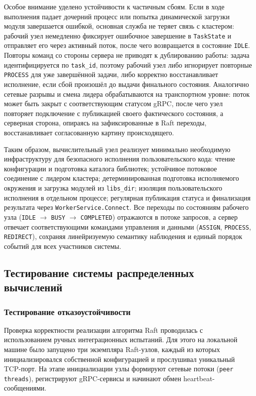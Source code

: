 Особое внимание уделено устойчивости к частичным сбоям. Если в ходе выполнения
падает дочерний процесс или попытка динамической загрузки модуля завершается
ошибкой, основная служба не теряет связь с кластером: рабочий узел немедленно
фиксирует ошибочное завершение в \texttt{TaskState} и отправляет его через
активный поток, после чего возвращается в состояние \texttt{IDLE}. Повторы
команд со стороны сервера не приводят к дублированию работы: задача
идентифицируется по \texttt{task\_id}, поэтому рабочий узел либо игнорирует повторные
\texttt{PROCESS} для уже завершённой задачи, либо корректно восстанавливает
исполнение, если сбой произошёл до выдачи финального состояния. Аналогично
сетевые разрывы и смена лидера обрабатываются на транспортном уровне: поток
может быть закрыт с соответствующим статусом gRPC, после чего узел повторяет
подключение с публикацией своего фактического состояния, а серверная сторона,
опираясь на зафиксированные в Raft переходы, восстанавливает согласованную
картину происходящего.

Таким образом, вычислительный узел реализует минимально необходимую
инфраструктуру для безопасного исполнения пользовательского кода: чтение
конфигурации и подготовка каталога библиотек; устойчивое потоковое соединение с
лидером кластера; детерминированная подготовка исполняемого окружения и
загрузка модулей из \texttt{libs\_dir}; изоляция пользовательского исполнения в
отдельном процессе; регулярная публикация статуса и финализация результата
через \texttt{WorkerService.Connect}. Все переходы по состояниям рабочего узла
(\texttt{IDLE} $\rightarrow$ \texttt{BUSY} $\rightarrow$ \texttt{COMPLETED})
отражаются в потоке запросов, а сервер отвечает соответствующими командами
управления и данными (\texttt{ASSIGN}, \texttt{PROCESS}, \texttt{REDIRECT}),
сохраняя линейризуемую семантику наблюдения и единый порядок событий для всех
участников системы.

\subsection{Тестирование системы распределенных вычислений}

\subsubsection{Тестирование отказоустойчивости}

Проверка корректности реализации алгоритма Raft проводилась с использованием
ручных интеграционных испытаний. Для этого на локальной машине было запущено
три экземпляра Raft-узлов, каждый из которых инициализировался собственной
конфигурацией и прослушивал уникальный TCP-порт. На этапе инициализации узлы
формируют сетевые потоки (\texttt{peer threads}), регистрируют gRPC-сервисы и
начинают обмен heartbeat-сообщениями.

